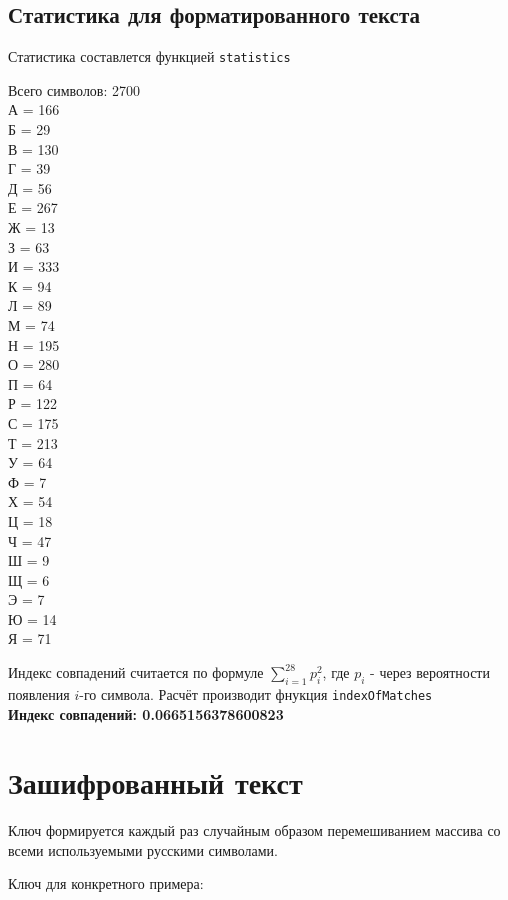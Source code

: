 \documentclass[a4paper, 14pt]{extarticle}
\begin{document}
\subsection{Статистика для форматированного текста}

Статистика составлется функцией \texttt{statistics}

\noindent Всего символов: 2700\\

\noindent А = 166
\\Б = 29
\\В = 130
\\Г = 39
\\Д = 56
\\Е = 267
\\Ж = 13
\\З = 63
\\И = 333
\\К = 94
\\Л = 89
\\М = 74
\\Н = 195
\\О = 280
\\П = 64
\\Р = 122
\\С = 175
\\Т = 213
\\У = 64
\\Ф = 7
\\Х = 54
\\Ц = 18
\\Ч = 47
\\Ш = 9
\\Щ = 6
\\Э = 7
\\Ю = 14
\\Я = 71

Индекс совпадений считается по формуле $\sum^{28}_{i=1} p_i^2$, где $p_i$ - через вероятности появления $i$-го символа. Расчёт производит фнукция \texttt{indexOfMatches}\\

\textbf{Индекс совпадений: 0.0665156378600823}

\section{Зашифрованный текст}

Ключ формируется каждый раз случайным образом перемешиванием массива со всеми используемыми русскими символами.

Ключ для конкретного примера:\\
\end{document}
